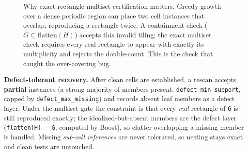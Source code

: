 \documentclass[
  11pt,
]{article}
\begin{document}
\begin{figure}[htb]\centering
{}
\caption{Why exact rectangle-multiset certification matters. Greedy growth over a dense periodic region can place two cell instances that overlap, reproducing a rectangle twice. A containment check ($G\subseteq\mathrm{flatten}(H)$) accepts this invalid tiling; the exact multiset check requires every real rectangle to appear with exactly its multiplicity and rejects the double-count. This is the check that caught the over-covering bug.}
\label{fig:verify}
\end{figure}

\textbf{Defect-tolerant recovery.} After clean cells are established, a
rescan accepts \textbf{partial} instances (a strong majority of members
present, \texttt{defect\_min\_support}, capped by
\texttt{defect\_max\_missing}) and records absent leaf members as a
defect layer. Under the multiset gate the constraint is that every
\emph{real} rectangle of \texttt{G} is still reproduced exactly; the
idealized-but-absent members are the defect layer
(\texttt{flatten(H)\ −\ G}, computed by Boost), so clutter overlapping a
missing member is handled. Missing \emph{sub-cell references} are never
tolerated, so nesting stays exact and clean tests are untouched.
\end{document}
